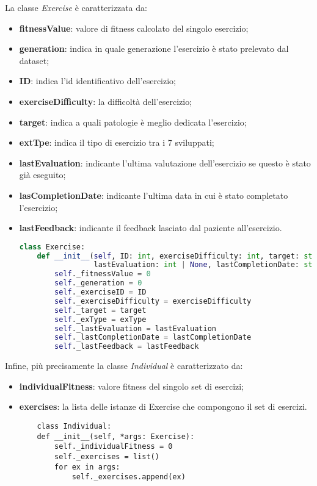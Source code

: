 \documentclass{article}
\begin{document}
\bigskip
\label{sec:exerciseImplementation}
La classe \textit{Exercise} è caratterizzata da:
\begin{itemize}
\item\textbf{fitnessValue}: valore di fitness calcolato del singolo esercizio;
\item\textbf{generation}: indica in quale generazione l'esercizio è stato prelevato dal dataset;
\item\textbf{ID}: indica l'id identificativo dell'esercizio;
\item\textbf{exerciseDifficulty}: la difficoltà dell'esercizio;
\item\textbf{target}: indica a quali patologie è meglio dedicata l'esercizio;
\item\textbf{extTpe}: indica il tipo di esercizio tra i 7 sviluppati;
\item\textbf{lastEvaluation}: indicante l'ultima valutazione dell'esercizio se questo è stato già eseguito;
\item\textbf{lasCompletionDate}: indicante l'ultima data in cui è stato completato l'esercizio;
\item\textbf{lastFeedback}: indicante il feedback lasciato dal paziente all'esercizio.

\begin{lstlisting}[language=Python, breaklines, no caption]
    class Exercise:
    def __init__(self, ID: int, exerciseDifficulty: int, target: str, exType: str,
                 lastEvaluation: int | None, lastCompletionDate: str | None, lastFeedback: int | None):
        self._fitnessValue = 0
        self._generation = 0
        self._exerciseID = ID
        self._exerciseDifficulty = exerciseDifficulty
        self._target = target
        self._exType = exType
        self._lastEvaluation = lastEvaluation
        self._lastCompletionDate = lastCompletionDate
        self._lastFeedback = lastFeedback

\end{lstlisting}
\end{itemize}
\label{sec:individualImplementation}
Infine, più precisamente la classe \textit{Individual} è caratterizzato da:
\begin{itemize}
\item\textbf{individualFitness}: valore fitness del singolo set di esercizi;
\item\textbf{exercises}: la lista delle istanze di Exercise che compongono il set di esercizi.
\begin{lstlisting}
    class Individual:
    def __init__(self, *args: Exercise):
        self._individualFitness = 0
        self._exercises = list()
        for ex in args:
            self._exercises.append(ex)
\end{lstlisting}
\end{itemize}
\end{document}

